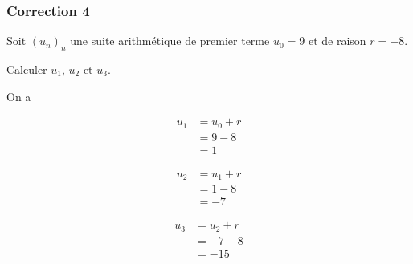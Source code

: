 \documentclass[15pt, mathserif]{beamer}
\begin{document}
\begin{frame}
\vspace{-10mm}
	\frametitle{Correction 4}
Soit $(u_n)_n$ une suite arithmétique de premier terme $u_0=9$ et de raison $r=-8$. 
 
 Calculer $u_1$, $u_2$ et $u_3$. 
 
 On a 
 \begin{minipage}{0.25\textwidth} 
 
 \begin{align*} 
 u_1 &= u_0+r \\ &= 9-8 \\ &=1
 \end{align*} 
  
 \end{minipage} \hfil \begin{minipage}{0.25\textwidth} 
 
 \begin{align*} 
 u_2 &= u_1+r \\ &= 1-8 \\ &=-7
 \end{align*} 
 
 \end{minipage} \hfil \begin{minipage}{0.25\textwidth} 
 
 \begin{align*} 
 u_3 &= u_2+r \\ &= -7-8 \\ &=-15
 \end{align*} 
 
 \end{minipage} 
\end{frame}
\end{document}

